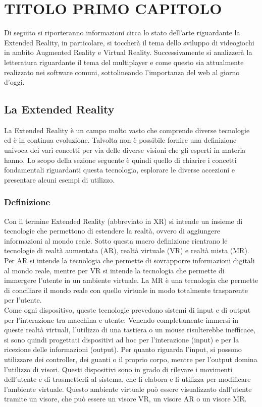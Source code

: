 \chapter{TITOLO PRIMO CAPITOLO}\label{chap:Letteratura}
Di seguito si riporteranno informazioni circa lo stato dell'arte riguardante la Extended Reality, in particolare, si toccherà il tema dello sviluppo di videogiochi in ambito 
Augmented Reality e Virtual Reality. Successivamente si analizzerà la letteratura riguardante il tema del multiplayer e come questo sia attualmente realizzato nei software comuni,
sottolineando l'importanza del web al giorno d'oggi.

\section{La Extended Reality}\label{sec:XR}
    La Extended Reality è un campo molto vasto che comprende diverse tecnologie ed è in continua evoluzione. Talvolta non è possibile fornire una definizione univoca dei vari 
    concetti per via delle diverse visioni che gli esperti in materia hanno. Lo scopo della sezione seguente è quindi quello di chiarire i concetti fondamentali riguardanti
    questa tecnologia, esplorare le diverse accezioni e presentare alcuni esempi di utilizzo.
    \subsection{Definizione}\label{subsec:XRDef}
        Con il termine Extended Reality (abbreviato in XR) si intende un insieme di tecnologie che permettono di estendere la realtà, ovvero di aggiungere informazioni al mondo 
        reale. Sotto questa macro definizione rientrano le tecnologie di realtà aumentata (AR), realtà virtuale (VR) e realtà mista (MR). Per AR si intende la tecnologia che permette 
        di sovrapporre informazioni digitali al mondo reale, mentre per VR si intende la tecnologia che permette di immergere l'utente in un ambiente virtuale. La MR è una tecnologia
        che permette di conciliare il mondo reale con quello virtuale in modo totalmente trasparente per l'utente. \\
        Come ogni dispositivo, queste tecnologie prevedono sistemi di input e di output per l'interazione tra macchina e utente. Venendo completamente immersi in queste realtà 
        virtuali, l'utilizzo di una tastiera o un mouse risulterebbe
        inefficace, si sono quindi progettati dispositivi ad hoc per l'interazione (input) e per la ricezione delle informazioni (output). Per quanto riguarda l'input, si possono
        utilizzare dei controller, dei guanti o il proprio corpo, mentre per l'output domina l'utilizzo di visori. Questi dispositivi sono in grado di rilevare i movimenti 
        dell'utente e di trasmetterli al sistema, che li elabora e li utilizza per modificare l'ambiente virtuale. Questo ambiente virtuale può essere visualizzato dall'utente 
        tramite un visore, che può essere un visore VR, un visore AR o un visore MR.
